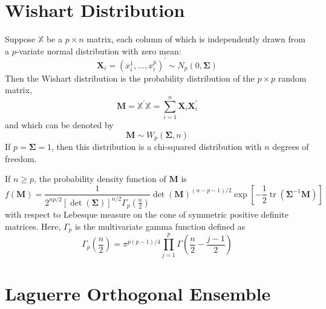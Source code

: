 \section{Wishart Distribution}

\begin{definition}
    Suppose $\mathbb{X}$ be a $p\times n$ matrix, each column of which is independently drawn from a $p$-variate normal distribution with zero mean:
    \begin{equation*}
        \mathbf{X}_{i}=\left(x_{i}^{1},\ldots,x_{i}^{p}\right)^{\prime}\sim N_{p}(0,\boldsymbol{\Sigma})
    \end{equation*}
    Then the Wishart distribution is the probability distribution of the $p\times p$ random matrix,
    \begin{equation}
        \mathbf{M}=\mathbb{X}^{\prime}\mathbb{X}=\sum_{i=1}^{n}\mathbf{X}_{i}\mathbf{X}_{i}^{\prime}
    \end{equation}
    and which can be denoted by
    \begin{equation*}
        \mathbf{M}\sim W_{p}\left(\boldsymbol{\Sigma},n\right)
    \end{equation*}
    If $p=\boldsymbol{\Sigma}=1$, then this distribution is a chi-squared distribution with $n$ degrees of freedom.
\end{definition}

\begin{note}
    If $n\geq p$, the probability density function of $\mathbf{M}$ is
    \begin{equation}
        f\left(\mathbf{M}\right)=\frac{1}{2^{np/2}\left[\operatorname{det}\left(\boldsymbol{\Sigma}\right)\right]^{n/2}\Gamma_{p}\left(\frac{n}{2}\right)}\operatorname{det}\left(\mathbf{M}\right)^{(n-p-1)/2}\exp\left[-\frac{1}{2}\operatorname{tr}\left(\boldsymbol{\Sigma}^{-1}\mathbf{M}\right)\right]
        \label{eq:pdf-wishart}
    \end{equation}
    with respect to Lebesque measure on the cone of symmetric positive definite matrices. Here, $\Gamma_{p}$ is the multivariate gamma function defined as
    \begin{equation*}
        \Gamma_{p}\left(\frac{n}{2}\right)=\pi^{p(p-1)/4}\prod_{j=1}^{p}\Gamma\left(\frac{n}{2}-\frac{j-1}{2}\right)
    \end{equation*}
\end{note}

\section{Laguerre Orthogonal Ensemble}

